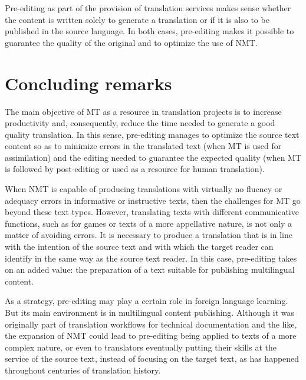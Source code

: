 \documentclass[output=paper,colorlinks,citecolor=brown,
]{langscibook}
\begin{document}
\begin{sloppypar}
Pre-editing as part of the provision of translation services makes sense whether the content is written solely to generate a translation or if it is also to be published in the source language. In both cases, pre-editing makes it possible to guarantee the quality of the original and to optimize the use of NMT.
\end{sloppypar}

\section{Concluding remarks}

The main objective of MT as a resource in translation projects is to increase productivity and, consequently, reduce the time needed to generate a good quality translation. In this sense, pre-editing manages to optimize the source text content so as to minimize errors in the translated text (when MT is used for assimilation) and the editing needed to guarantee the expected quality (when MT is followed by post-editing or used as a resource for human translation).

When NMT is capable of producing translations with virtually no fluency or adequacy errors in informative or instructive texts, then the challenges for MT go beyond these text types. However, translating texts with different communicative functions, such as for games or texts of a more appellative nature, is not only a matter of avoiding errors. It is necessary to produce a translation that is in line with the intention of the source text and with which the target reader can identify in the same way as the source text reader. In this case, pre-editing takes on an added value: the preparation of a text suitable for publishing multilingual content.

As a strategy, pre-editing may play a certain role in foreign language learning. But its main environment is in multilingual content publishing. Although it was originally part of translation workflows for technical documentation and the like, the expansion of NMT could lead to pre-editing being applied to texts of a more complex nature, or even to translators eventually putting their skills at the service of the source text, instead of focusing on the target text, as has happened throughout centuries of translation history.


\printbibliography[heading=subbibliography,notkeyword=this]
\end{document}
